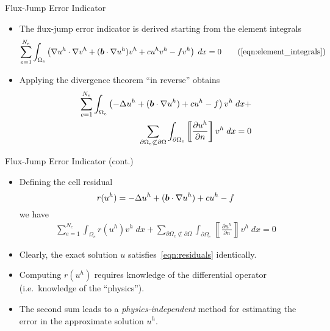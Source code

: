 \begin{frame}{Flux-Jump Error Indicator}
\begin{itemize}
\item The flux-jump error indicator is derived starting from the element
  integrals
    \begin{equation}
      \eqneltint\tag{\ref{eqn:element_integrals}}
    \end{equation}

  \item Applying the divergence theorem ``in reverse'' obtains
    \begin{eqnarray}
      \sum_{e=1}^{N_e} \int_{\Omega_e}
      \left( -\Delta u^h  + ({\boldsymbol{b}} \cdot \nabla u^h) + cu^h
      -f \right) v^h \;  dx + \\
      \nonumber
      \sum_{\partial \Omega_e \not \subset  \partial \Omega}
      \int_{\partial \Omega_e} \left\llbracket \frac{\partial u^h}{\partial n} \right\rrbracket v^h \; dx=0
    \end{eqnarray}
\end{itemize}
\end{frame}


\begin{frame}{Flux-Jump Error Indicator (cont.)}
  \begin{itemize}
  \item Defining the cell residual
    \begin{equation}
      r(u^h) = -\Delta u^h  + ({\boldsymbol{b}} \cdot \nabla u^h) + cu^h -f
    \end{equation}
    we have
    \begin{eqnarray}
      \label{eqn:residuals}
      \sum_{e=1}^{N_e} \int_{\Omega_e}
      r(u^h) v^h \;  dx +
      \sum_{\partial \Omega_e \not \subset  \partial \Omega}
      \int_{\partial \Omega_e} \left\llbracket \frac{\partial u^h}{\partial n} \right\rrbracket v^h \; dx=0
    \end{eqnarray}

  \item Clearly, the exact solution $u$ satisfies~\eqref{eqn:residuals} identically.

  \item Computing $r(u^h)$ requires
    knowledge of the differential operator (i.e.\ knowledge of the ``physics'').

  \item The second sum leads to a \emph{physics-independent} method for estimating the
    error in the approximate solution $u^h$.

  \end{itemize}
\end{frame}




